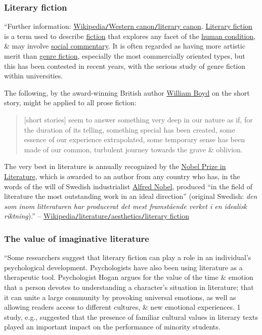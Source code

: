 \documentclass[oneside]{book}
\numberwithin{equation}{section}
\begin{document}
\subsubsection{Literary fiction}
``Further information: \href{https://en.wikipedia.org/wiki/Western_canon#Literary_canon}{Wikipedia\texttt{/}Western canon\texttt{/}literary canon}. \href{https://en.wikipedia.org/wiki/Literary_fiction}{Literary fiction} is a term used to describe \href{https://en.wikipedia.org/wiki/Fiction}{fiction} that explores any facet of the \href{https://en.wikipedia.org/wiki/Human_condition}{human condition}, \& may involve \href{https://en.wikipedia.org/wiki/Social_commentary}{social commentary}. It is often regarded as having more artistic merit than \href{https://en.wikipedia.org/wiki/Genre_fiction}{genre fiction}, especially the most commercially oriented types, but this has been contested in recent years, with the serious study of genre fiction within universities.

The following, by the award-winning British author \href{https://en.wikipedia.org/wiki/William_Boyd_(writer)}{William Boyd} on the short story, might be applied to all prose fiction:
\begin{quotation}
	[short stories] seem to answer something very deep in our nature as if, for the duration of its telling, something special has been created, some essence of our experience extrapolated, some temporary sense has been made of our common, turbulent journey towards the grave \& oblivion.
\end{quotation}
The very best in literature is annually recognized by the \href{https://en.wikipedia.org/wiki/Nobel_Prize_in_Literature}{Nobel Prize in Literature}, which is awarded to an author from any country who has, in the words of the will of Swedish industrialist \href{https://en.wikipedia.org/wiki/Alfred_Nobel}{Alfred Nobel}, produced ``in the field of literature the most outstanding work in an ideal direction'' (original Swedish: \textit{den som inom litteraturen har producerat det mest framstående verket i en idealisk riktning}).'' -- \href{https://en.wikipedia.org/wiki/Literature#Literary_fiction}{Wikipedia\texttt{/}literature\texttt{/}aesthetics\texttt{/}literary fiction}

\subsubsection{The value of imaginative literature}
``Some researchers suggest that literary fiction can play a role in an individual's psychological development. Psychologists have also been using literature as a therapeutic tool. Psychologist Hogan argues for the value of the time \& emotion that a person devotes to understanding a character's situation in literature; that it can unite a large community by provoking universal emotions, as well as allowing readers access to different cultures, \& new emotional experiences. 1 study, e.g., suggested that the presence of familiar cultural values in literary texts played an important impact on the performance of minority students.
\end{document}
